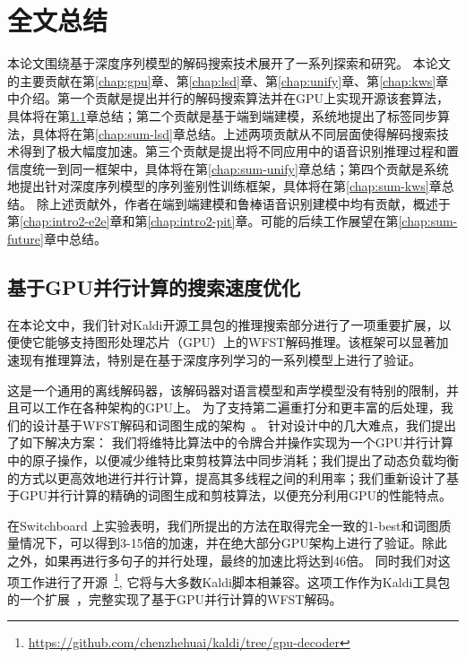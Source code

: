 
\chapter{全文总结}
\label{chap:sum}

本论文围绕基于深度序列模型的解码搜索技术展开了一系列探索和研究。
本论文的主要贡献在第\ref{chap:gpu}章、第\ref{chap:lsd}章、第\ref{chap:unify}章、第\ref{chap:kws}章中介绍。第一个贡献是提出并行的解码搜索算法并在GPU上实现开源该套算法，具体将在第\ref{chap:sum-gpu}章总结；第二个贡献是基于端到端建模，系统地提出了标签同步算法，具体将在第\ref{chap:sum-lsd}章总结。上述两项贡献从不同层面使得解码搜索技术得到了极大幅度加速。第三个贡献是提出将不同应用中的语音识别推理过程和置信度统一到同一框架中，具体将在第\ref{chap:sum-unify}章总结；第四个贡献是系统地提出针对深度序列模型的序列鉴别性训练框架，具体将在第\ref{chap:sum-kws}章总结。
除上述贡献外，作者在端到端建模和鲁棒语音识别建模中均有贡献，概述于第\ref{chap:intro2-e2e}章和第\ref{chap:intro2-pit}章。可能的后续工作展望在第\ref{chap:sum-future}章中总结。

\section{基于GPU并行计算的搜索速度优化}
\label{chap:sum-gpu}

在本论文中，我们针对Kaldi开源工具包的推理搜索部分进行了一项重要扩展，以便使它能够支持图形处理芯片（GPU）上的WFST解码推理。该框架可以显著加速现有推理算法，特别是在基于深度序列学习的一系列模型上进行了验证。

这是一个通用的离线解码器，该解码器对语言模型和声学模型没有特别的限制，并且可以工作在各种架构的GPU上。
为了支持第二遍重打分和更丰富的后处理，我们的设计基于WFST解码和词图生成的架构~\cite{povey2012generating}。
针对设计中的几大难点，我们提出了如下解决方案：
我们将维特比算法中的令牌合并操作实现为一个GPU并行计算中的原子操作，以便减少维特比束剪枝算法中同步消耗；我们提出了动态负载均衡的方式以更高效地进行并行计算，提高其多线程之间的利用率；我们重新设计了基于GPU并行计算的精确的词图生成和剪枝算法，以便充分利用GPU的性能特点。


在Switchboard 上实验表明，我们所提出的方法在取得完全一致的1-best和词图质量情况下，可以得到3-15倍的加速，并在绝大部分GPU架构上进行了验证。除此之外，如果再进行多句子的并行处理，最终的加速比将达到46倍。
同时我们对这项工作进行了开源~\footnote{\url{https://github.com/chenzhehuai/kaldi/tree/gpu-decoder}},
它将与大多数Kaldi脚本相兼容。这项工作作为Kaldi工具包的一个扩展~\cite{povey2011kaldi}，完整实现了基于GPU并行计算的WFST解码。



